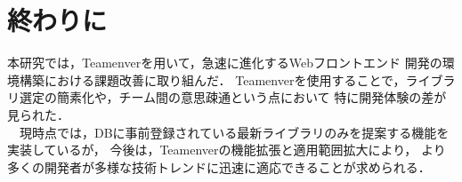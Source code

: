 \documentclass[main]{subfiles}
\begin{document}
\section{終わりに}
本研究では，Teamenverを用いて，急速に進化するWebフロントエンド
開発の環境構築における課題改善に取り組んだ．
Teamenverを使用することで，ライブラリ選定の簡素化や，チーム間の意思疎通という点において
特に開発体験の差が見られた．\\
　現時点では，DBに事前登録されている最新ライブラリのみを提案する機能を実装しているが，
今後は，Teamenverの機能拡張と適用範囲拡大により，
より多くの開発者が多様な技術トレンドに迅速に適応できることが求められる．
\end{document}
